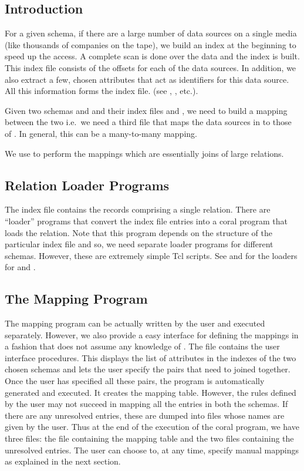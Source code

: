 \subsection{Introduction}

For a given schema, if there are a large number of data sources on a
single media (like thousands of companies on the 
tape), we build an index at the beginning to speed up the access. A
complete scan is done over the data and the index is built.  This
index file consists of the offsets for each of the data sources. In
addition, we also extract a few, chosen attributes that act as
identifiers for this data source.  All this information forms the
index file. (see , , etc.).

Given two schemas  and  and their index files
 and , we need to build a mapping
between the two i.e.\ we need a third file 
that maps the data sources in  to those of .  In
general, this can be a many-to-many mapping.

We use  to perform the mappings which are essentially
joins of large relations.

\subsection{Relation Loader Programs}

The index file contains the records comprising a single relation.
There are ``loader'' programs that convert the index file entries into
a coral program that loads the relation. Note that this program
depends on the structure of the particular index file and so, we need
separate loader programs for different schemas. However, these are
extremely simple Tcl scripts.  See  and
 for the loaders for  and
.

\subsection{The Mapping Program}

The  mapping program can be actually written by the user
and executed separately. However, we also provide a easy interface for
defining the mappings in a fashion that does not assume any knowledge
of .  The file  contains the user
interface procedures.  This displays the list of attributes in the
indexes of the two chosen schemas and lets the user specify the pairs
that need to joined together. Once the user has specified all these
pairs, the  program is automatically generated and
executed.  It creates the mapping table. However, the rules defined by
the user may not succeed in mapping all the entries in both the
schemas. If there are any unresolved entries, these are dumped into
files whose names are given by the user. Thus at the end of the
execution of the coral program, we have three files: the file
containing the mapping table and the two files containing the
unresolved entries. The user can choose to, at any time, specify
manual mappings as explained in the next section.

